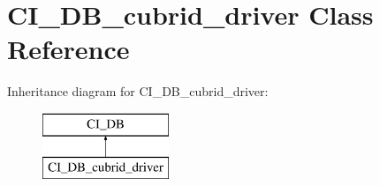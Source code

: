 \hypertarget{class_c_i___d_b__cubrid__driver}{\section{C\-I\-\_\-\-D\-B\-\_\-cubrid\-\_\-driver Class Reference}
\label{class_c_i___d_b__cubrid__driver}
}
Inheritance diagram for C\-I\-\_\-\-D\-B\-\_\-cubrid\-\_\-driver\-:\begin{figure}[H]
\begin{center}
\leavevmode
\includegraphics[height=2.000000cm]{class_c_i___d_b__cubrid__driver}
\end{center}
\end{figure}
